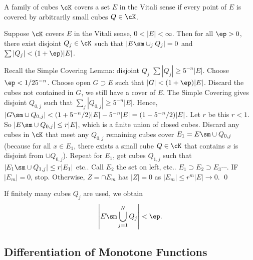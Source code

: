 \begin{dfn}
A family of cubes $\cK$ covers a set $E$ in the Vitali sense if every point of $E$ is covered by arbitrarily small cubes $Q \in \cK$. 
\end{dfn}


\begin{lem} \label{lem:vitali}
Suppose $\cK$ covers $E$ in the Vitali sense, $0<|E|<\infty$. Then for all $\ep>0$, there exist disjoint $Q_j \in \cK$ such that $|E \sm \cup_j Q_j|= 0$ and $\sum |Q_j| < (1+\ep)|E|$. 
\end{lem}

\pf Recall the Simple Covering Lemma: disjoint $Q_j$ $\sum |Q_j| \geq 5^{-n} |E|$. Choose $\ep<1/2 5^{-n}$. Choose open $G \supset E$ such that $|G| < (1+\ep)|E|$. Discard the cubes not contained in $G$, we still have a cover of $E$. The Simple Covering gives disjoint $Q_{0,j}$ such that $\sum_j |Q_{0,j}| \geq 5^{-n} |E|$. Hence, $|G \sm \cup Q_{0,j}| < (1+ 5^{-n}/2) |E| - 5^{-n} |E|= (1-5^{-n}/2)|E|$. Let $r$ be this $r<1$. So $|E \sm \cup Q_{0,j}| \leq r|E|$, which is a finite union of closed cubes. Discard any cubes in $\cK$ that meet any $Q_{0,j}$ remaining cubes cover $E_1= E \sm \cup Q_{0,j}$ (because for all $x \in E_1$, there exists a small cube $Q \in \cK$ that contains $x$ is disjoint from $\cup Q_{0,j}$). Repeat for $E_1$, get cubes $Q_{1,j}$ such that $|E_1 \sm \cup Q_{1,j}| \leq r|E_1|$ etc.. Call $E_2$ the set on left, etc.. $E_1 \supset E_2 \supset E_3 \cdots$. IF $|E_m|=0$, stop. Otherwise, $Z= \cap E_m$ has $|Z|=0$ as $|E_m| \leq r^m |E| \to 0$. \qed \\




\begin{rem}
If finitely many cubes $Q_j$ are used, we obtain
	\[
	\left| E \sm \bigcup_{j=1}^N Q_j \right| < \ep.
	\]
\end{rem}










\subsection{Differentiation of Monotone Functions}




